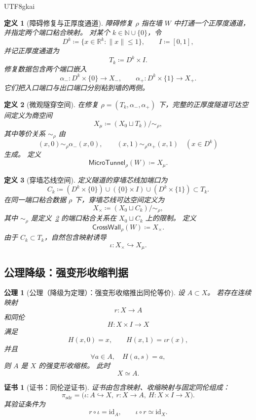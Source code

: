 \documentclass[12pt]{article}
\newtheorem{definition}{定义}[section]
\newtheorem{axiom}{公理}[section]
\newtheorem{Certificate}{证书}[section]
\newcommand{\NN}{\mathbb{N}}
\newcommand{\RR}{\mathbb{R}}
\newcommand{\MicroTunnel}{\mathsf{MicroTunnel}}
\newcommand{\CrossWall}{\mathsf{CrossWall}}
\newcommand{\DefEq}{\coloneqq}
\newcommand{\id}{\mathrm{id}}
\newcommand{\incl}{\iota}
\begin{document}
\begin{CJK*}{UTF8}{gkai}
\begin{definition}[障碍修复与正厚度通道]
\label{def:tex55-repair}
障碍修复 \(\rho\) 指在墙 \(W\) 中打通一个正厚度通道，并指定两个端口粘合映射。
对某个 \(k\in\NN\cup\{0\}\)，令
\[
  D^k\DefEq\{x\in\RR^k:\|x\|\le 1\},
  \qquad
  I\DefEq[0,1],
\]
并记正厚度通道为
\[
  T_k\DefEq D^k\times I.
\]
修复数据包含两个端口嵌入
\[
  \alpha_-:D^k\times\{0\}\longrightarrow X_-,
  \qquad
  \alpha_+:D^k\times\{1\}\longrightarrow X_+.
\]
它们把入口端口与出口端口分别粘到墙的两侧。
\end{definition}

\begin{definition}[微观隧穿空间]
\label{def:tex55-microtunnel}
在修复 \(\rho=(T_k,\alpha_-,\alpha_+)\) 下，完整的正厚度隧道可达空间定义为商空间
\[
  X_{\mu}
  \DefEq
  (X_0\sqcup T_k)/{\sim_{\rho}},
\]
其中等价关系 \(\sim_{\rho}\) 由
\[
  (x,0)\sim_{\rho}\alpha_-(x,0),
  \qquad
  (x,1)\sim_{\rho}\alpha_+(x,1)
  \quad (x\in D^k)
\]
生成。
定义
\[
  \MicroTunnel_{\rho}(W)\DefEq X_{\mu}.
\]
\end{definition}

\begin{definition}[穿墙芯线空间]
\label{def:tex55-crosswall}
定义隧道的穿墙芯线加端口为
\[
  C_k
  \DefEq
  (D^k\times\{0\})
  \cup
  (\{0\}\times I)
  \cup
  (D^k\times\{1\})
  \subset T_k.
\]
在同一端口粘合数据 \(\rho\) 下，穿墙芯线可达空间定义为
\[
  X_{\times}
  \DefEq
  (X_0\sqcup C_k)/{\sim_{\rho}},
\]
其中 \(\sim_{\rho}\) 是定义~\ref{def:tex55-microtunnel} 的端口粘合关系在
\(X_0\sqcup C_k\) 上的限制。
定义
\[
  \CrossWall_{\rho}(W)\DefEq X_{\times}.
\]
由于 \(C_k\subset T_k\)，自然包含映射诱导
\[
  \incl:X_{\times}\hookrightarrow X_{\mu}.
\]
\end{definition}

\subsection{公理降级：强变形收缩判据}
\label{subsec:tex55-deformation-criterion}

\begin{axiom}[公理（降级为定理）：强变形收缩推出同伦等价]
\label{ax:tex55-sdr-homotopy-equivalence}
设 \(A\subset X\)。
若存在连续映射
\[
  r:X\to A
\]
和同伦
\[
  H:X\times I\to X
\]
满足
\[
  H(x,0)=x,
  \qquad
  H(x,1)=\incl r(x),
\]
并且
\[
  \forall a\in A,\quad H(a,s)=a,
\]
则 \(A\) 是 \(X\) 的强变形收缩核。
此时
\[
  X\simeq A.
\]
\end{axiom}

\begin{Certificate}[证书：同伦逆证书]
\label{cert:tex55-sdr-homotopy-equivalence}
证书由包含映射、收缩映射与固定同伦组成：
\[
  \pi_{\mathrm{sdr}}
  =
  \bigl(\incl:A\hookrightarrow X,\ r:X\to A,\ H:X\times I\to X\bigr).
\]
其验证条件为
\[
  r\circ\incl=\id_A,
  \qquad
  \incl\circ r\simeq\id_X.
\]
\end{Certificate}


\end{CJK*}
\end{document}
